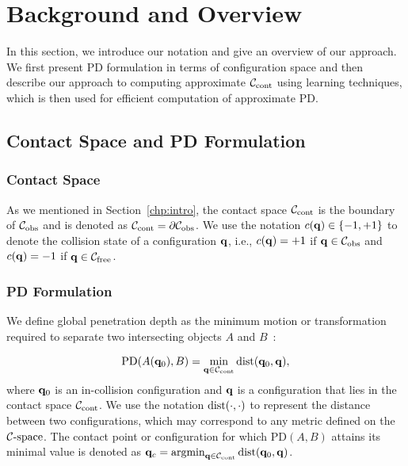 \section{Background and Overview}
\label{sec:2:overview}
In this section, we introduce our notation and give an overview of our approach. We first present PD formulation in terms of configuration space and then describe our approach to computing approximate $\mathcal C_\text{cont}$ using learning techniques, which is then used for efficient computation of approximate PD.

\subsection{Contact Space and PD Formulation}
\subsubsection{Contact Space}
As we mentioned in Section~\ref{chp:intro}, the contact space $\mathcal C_\text{cont}$ is the boundary of $\mathcal C_{\text{obs}}$ and is denoted as $\mathcal C_\text{cont} =\partial \mathcal C_{\text{obs}}$. We use the notation $c(\mathbf q) \in \{-1,+1\}$ to denote the collision state of a configuration $\mathbf q$, i.e., $c(\mathbf q)=+1$ if $\mathbf q \in \mathcal C_{\text{obs}}$ and $c(\mathbf q)=-1$ if $\mathbf q \in \mathcal C_{\text{free}}$.

\subsubsection{PD Formulation}
We define global penetration depth as the minimum motion or transformation required to separate two intersecting objects $A$ and $B$~\cite{Agarwal:2000:CPD,Kim:2002:DEEP}:

\begin{align}
\label{eq:2:PDgdef} \text{PD}(A(\mathbf q_0), B) = \min_{\mathbf q \in
\mathcal C_\text{cont}} \operatorname{dist}(\mathbf q_0, \mathbf q),
\end{align}
where $\mathbf q_0$ is an in-collision configuration and $\mathbf q$ is a
configuration that lies in the contact space $\mathcal C_\text{cont}$.
We use the notation $\operatorname{dist}(\cdot, \cdot)$ to represent the distance between two configurations,
which may correspond to any metric defined on the $\mathcal C\text{-space}$. The
contact point or configuration for which PD$(A, B)$ attains its
minimal value is denoted as $\mathbf q_c = \operatorname{argmin}_{\mathbf q
\in \mathcal C_\text{cont}} \operatorname{dist}(\mathbf q_0, \mathbf q)$.

